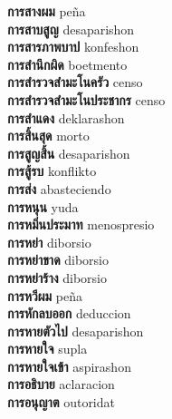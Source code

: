 \textbf{ การสางผม  } peña \\
\textbf{ การสาบสูญ  } desaparishon \\
\textbf{ การสารภาพบาป  } konfeshon \\
\textbf{ การสำนึกผิด  } boetmento \\
\textbf{ การสำรวจสำมะโนครัว  } censo \\
\textbf{ การสำรวจสำมะโนประชากร  } censo \\
\textbf{ การสำแดง  } deklarashon \\
\textbf{ การสิ้นสุด  } morto \\
\textbf{ การสูญสิ้น  } desaparishon \\
\textbf{ การสู้รบ  } konflikto \\
\textbf{ การส่ง  } abasteciendo \\
\textbf{ การหนุน  } yuda \\
\textbf{ การหมิ่นประมาท  } menospresio \\
\textbf{ การหย่า  } diborsio \\
\textbf{ การหย่าขาด  } diborsio \\
\textbf{ การหย่าร้าง  } diborsio \\
\textbf{ การหวีผม  } peña \\
\textbf{ การหักลบออก  } deduccion \\
\textbf{ การหายตัวไป  } desaparishon \\
\textbf{ การหายใจ  } supla \\
\textbf{ การหายใจเข้า  } aspirashon \\
\textbf{ การอธิบาย  } aclaracion \\
\textbf{ การอนุญาต  } outoridat \\
